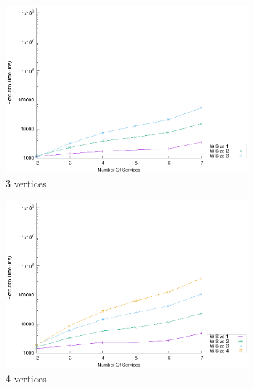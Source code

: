 \begin{figure}[!htb]
  \centering
  \begin{subfigure}{0.48\textwidth}
    \includegraphics[width=\textwidth]{Images/graphs/window_time_performance_qualitative_n7_s7_50_80_n3}
    \caption{3 vertices}
    \label{fig:time_window_perce_wide_3n}
  \end{subfigure}
  \hfill
  \begin{subfigure}{0.48\textwidth}
    \includegraphics[width=\textwidth]{Images/graphs/window_time_performance_qualitative_n7_s7_50_80_n4}
    \caption{4 vertices}
    \label{fig:time_window_perce_wide_4n}
  \end{subfigure}
  \hfill
  \begin{subfigure}{0.48\textwidth}

\end{subfigure}
\end{figure}
